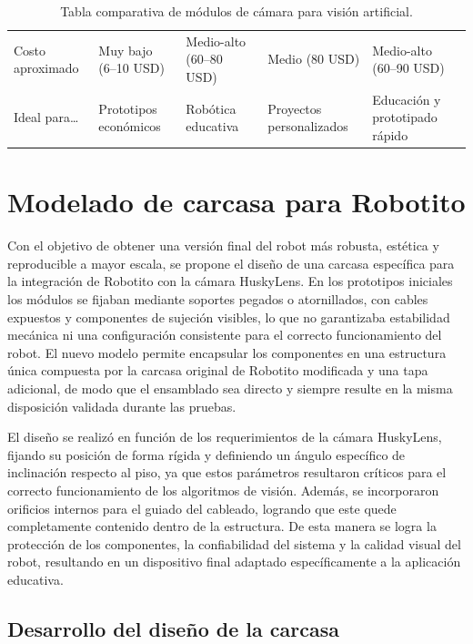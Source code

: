 \documentclass{prgrado}
\begin{document}
\begin{appendix}
\begin{table}[ht]
\begin{tabularx}{\textwidth}{L{2.6cm} Y Y Y Y}
        Costo aproximado &
        Muy bajo (6--10 USD) &
        Medio-alto (60--80 USD) &
        Medio (80 USD) &
        Medio-alto (60--90 USD) \\

        Ideal para\dots &
        Prototipos económicos &
        Robótica educativa &
        Proyectos personalizados &
        Educación y prototipado rápido \\
        \bottomrule
    \end{tabularx}
    \caption{Tabla comparativa de módulos de cámara para visión artificial.}
    \label{tab:comparativa-camaras}
\end{table}

\chapter{Modelado de carcasa para Robotito}

Con el objetivo de obtener una versión final del robot más robusta, estética y reproducible a mayor escala, se propone el diseño de una carcasa específica para la integración de Robotito con la cámara HuskyLens. En los prototipos iniciales los módulos se fijaban mediante soportes pegados o atornillados, con cables expuestos y componentes de sujeción visibles, lo que no garantizaba estabilidad mecánica ni una configuración consistente para el correcto funcionamiento del robot. El nuevo modelo permite encapsular los componentes en una estructura única compuesta por la carcasa original de Robotito modificada y una tapa adicional, de modo que el ensamblado sea directo y siempre resulte en la misma disposición validada durante las pruebas.

El diseño se realizó en función de los requerimientos de la cámara HuskyLens, fijando su posición de forma rígida y definiendo un ángulo específico de inclinación respecto al piso, ya que estos parámetros resultaron críticos para el correcto funcionamiento de los algoritmos de visión. Además, se incorporaron orificios internos para el guiado del cableado, logrando que este quede completamente contenido dentro de la estructura. De esta manera se logra la protección de los componentes, la confiabilidad del sistema y la calidad visual del robot, resultando en un dispositivo final adaptado específicamente a la aplicación educativa.

\section{Desarrollo del diseño de la carcasa}


\end{appendix}
\end{document}
